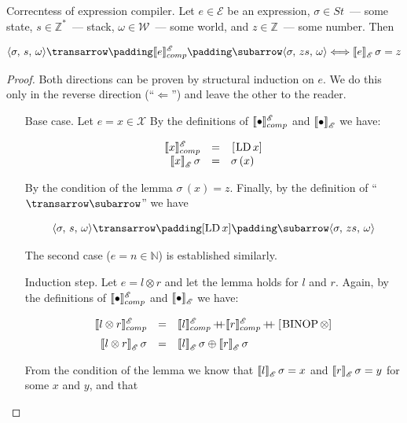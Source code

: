 \begin{lemma}{Correcntess of expression compiler.}
  Let $e\in\mathscr{E}$ be an expression, $\sigma\in St$~--- some state, $s\in\mathbb Z^*$~--- stack, $\omega\in\mathscr{W}$~--- some world, and $z\in\mathbb Z$~--- some number. Then

  \[
  \trans{\inbr{\sigma,\,s,\,\omega}}{\sembr{e}^\mathscr{E}_{comp}}{\inbr{\sigma,\,zs,\,\omega}}\Longleftrightarrow\sembr{e}^\ph_\mathscr{E}\,\sigma=z
  \]  
\end{lemma}
\begin{proof}
  Both directions can be proven by structural induction on $e$. We do this only in the reverse direction (``$\Leftarrow$'') and leave the other to the reader.
  \begin{itemize}
  \item[Base case.] Let $e=x\in\mathscr{X}$ By the definitions of $\llbracket{\bullet}\rrbracket^\mathscr{E}_{comp}$ and $\sembr{\bullet}^\ph_\mathscr{E}$ we have:

    \[
    \begin{array}{rcl}
      \sembr{x}^\mathscr{E}_{comp}&=&\llang{[LD$\,x$]}\\
      \sembr{x}^\ph_\mathscr{E}\,\sigma&=&\sigma\,(x)
    \end{array}
    \]

    By the condition of the lemma $\sigma\,(x)=z$. Finally, by the definition of ``$\transrel$'' we have

    \[
    \trans{\inbr{\sigma,\,s,\,\omega}}{[\llang{LD$\,x$}]}{\inbr{\sigma,\,zs,\,\omega}}
    \]

    The second case ($e=n\in\mathbb N$) is established similarly.

  \item[Induction step.] Let $e=l\otimes r$ and let the lemma holds for $l$ and $r$. Again, by the definitions of $\llbracket{\bullet}\rrbracket^\mathscr{E}_{comp}$ and $\sembr{\bullet}^\ph_\mathscr{E}$ we have:
    
    \[
    \begin{array}{rcl}
      \sembr{l\otimes r}^\mathscr{E}_{comp}&=&\sembr{l}^\mathscr{E}_{comp}\dplus\sembr{r}^\mathscr{E}_{comp}\dplus\llang{[BINOP$\,\otimes$]}\\[2mm]
      \sembr{l\otimes r}^\ph_\mathscr{E}\,\sigma&=&\sembr{l}^\ph_\mathscr{E}\,\sigma\oplus\sembr{r}^\ph_\mathscr{E}\,\sigma
    \end{array}
    \]

    From the condition of the lemma we know that $\sembr{l}^\ph_\mathscr{E}\,\sigma=x$ and $\sembr{r}^\ph_\mathscr{E}\,\sigma=y$ for some $x$ and $y$, and that


\end{itemize}
\end{proof}
